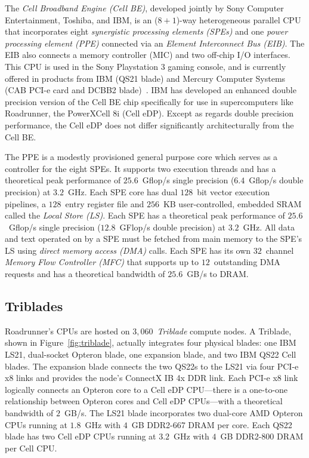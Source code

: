 \documentclass[journal,twoside]{IEEEtran}
\newcommand{\fig}[1]{Figure~\ref{fig:#1}}
\begin{document}

The \emph{Cell Broadband Engine (Cell BE)}, developed jointly by Sony
Computer Entertainment, Toshiba, and IBM, is an ($8+1$)-way
heterogeneous parallel CPU that incorporates eight
\emph{synergistic processing elements (SPEs)} and one
\emph{power processing element (PPE)} connected via an
\emph{Element Interconnect Bus (EIB)}.  The EIB also connects
a memory controller (MIC) and two off-chip I/O interfaces.  This CPU
is used in the Sony Playstation 3 gaming console, and is currently
offered in products from IBM (QS21 blade) and Mercury Computer Systems
(CAB PCI-e card and DCBB2 blade)~\cite{mercury}.  IBM has developed an
enhanced double precision version of the Cell BE chip specifically for
use in supercomputers like Roadrunner, the PowerXCell 8i (Cell eDP).
Except as regards double precision performance, the Cell eDP does not
differ significantly architecturally from the Cell BE.

The PPE is a modestly provisioned general purpose core which serves as
a controller for the eight SPEs.  It supports two execution threads and
has a theoretical peak performance of $25.6$~Gflop/s single precision
($6.4$~Gflop/s double precision) at $3.2$~GHz.  Each SPE core has dual
$128$~bit vector execution pipelines, a $128$~entry register file and
$256$~KB user-controlled, embedded SRAM called the \emph{Local Store
(LS)}.  Each SPE has a theoretical peak performance of $25.6$~Gflop/s
single precision ($12.8$~GFlop/s double precision) at $3.2$~GHz.  All
data and text operated on by a SPE must be fetched from main memory to
the SPE's LS using \emph{direct memory access (DMA)} calls.  Each SPE
has its own $32$~channel \emph{Memory Flow Controller (MFC)} that
supports up to $12$~outstanding DMA requests and has a theoretical
bandwidth of $25.6$~GB/s to DRAM.

\subsection{Triblades}

Roadrunner's CPUs are hosted on $3,060$~\emph{Triblade} compute nodes.
A Triblade, shown in \fig{triblade}, actually integrates four physical
blades: one IBM LS21, dual-socket Opteron blade, one expansion blade,
and two IBM QS22 Cell blades.  The expansion blade connects the two
QS22s to the LS21 via four PCI-e x8 links and provides the node's
ConnectX IB 4x DDR link.  Each PCI-e x8 link logically connects an
Opteron core to a Cell eDP CPU---there is a one-to-one relationship
between Opteron cores and Cell eDP CPUs---with a theoretical bandwidth
of $2$~GB/s.  The LS21 blade incorporates two dual-core AMD Opteron
CPUs running at $1.8$~GHz with $4$~GB DDR2-667 DRAM per core.  Each
QS22 blade has two Cell eDP CPUs running at $3.2$~GHz with $4$~GB
DDR2-800 DRAM per Cell CPU.
\end{document}

